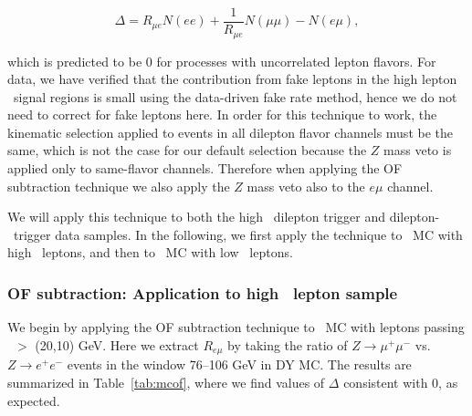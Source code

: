 \begin{equation}
\label{eq:ofhighpt}
\Delta = R_{\mu e}N(ee) + \frac{1}{R_{\mu e}}N(\mu\mu) - N(e\mu),
\end{equation}

which is predicted to be 0 for processes with uncorrelated lepton flavors. 
For data, we have verified that the contribution from fake leptons in the high lepton \pt\
signal regions is small using the data-driven fake rate method, hence we do not need to 
correct for fake leptons here. In order
for this technique to work, the kinematic selection applied to events in all dilepton
flavor channels must be the same, which is not the case for our default selection because the
$Z$ mass veto is applied only to same-flavor channels. Therefore when applying the OF
subtraction technique we also apply the $Z$ mass veto also to the $e\mu$ channel. 

We will apply this technique to both the high \pt\ dilepton trigger and dilepton-\Ht\ trigger data samples.
In the following, we first apply the technique to \ttbar\ MC with high \pt\ leptons, and then
to \ttbar\ MC with low \pt\ leptons.

\subsubsection{OF subtraction: Application to high \pt\ lepton sample}

We begin by applying the OF subtraction technique to \ttbar\ MC with leptons passing \pt\ $>$ (20,10) GeV.
Here we extract $R_{e\mu}$ by taking the ratio of $Z \to \mu^+\mu^-$ vs. $Z \to e^+e^-$ events in the
window 76--106 GeV in DY MC. The results are summarized in Table~\ref{tab:mcof}, where we find
values of $\Delta$ consistent with 0, as expected.

